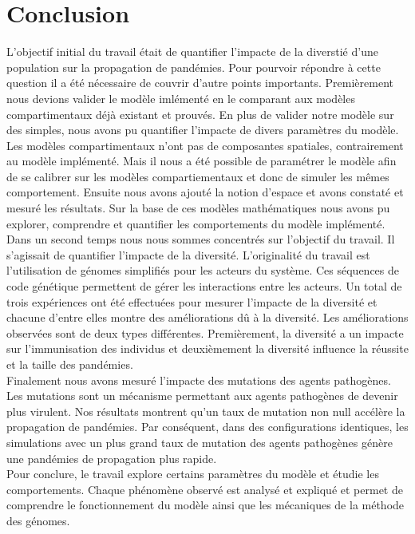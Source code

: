\chapter{Conclusion} \label{ch:conclusion}

L'objectif initial du travail était de quantifier l'impacte de la diverstié d'une population sur la propagation de pandémies. Pour pourvoir répondre à cette question il a été nécessaire de couvrir d'autre points importants. Premièrement nous devions valider le modèle imlémenté en le comparant aux modèles compartimentaux déjà existant et prouvés. En plus de valider notre modèle sur des simples, nous avons pu quantifier l'impacte de divers paramètres du modèle. Les modèles compartimentaux n'ont pas de composantes spatiales, contrairement au modèle implémenté. Mais il nous a été possible de paramétrer le modèle afin de se calibrer sur les modèles compartiementaux et donc de simuler les mêmes comportement. Ensuite nous avons ajouté la notion d'espace et avons constaté et mesuré les résultats. Sur la base de ces modèles mathématiques nous avons pu explorer, comprendre et quantifier les comportements du modèle implémenté.\\

Dans un second temps nous nous sommes concentrés sur l'objectif du travail. Il s'agissait de quantifier l'impacte de la diversité. L'originalité du travail est l'utilisation de génomes simplifiés pour les acteurs du système. Ces séquences de code génétique permettent de gérer les interactions entre les acteurs. Un total de trois expériences ont été effectuées pour mesurer l'impacte de la diversité et chacune d'entre elles montre des améliorations dû à la diversité. Les améliorations observées sont de deux types différentes. Premièrement, la diversité a un impacte sur l'immunisation des individus et deuxièmement la diversité influence la réussite et la taille des pandémies.\\

Finalement nous avons mesuré l'impacte des mutations des agents pathogènes. Les mutations sont un mécanisme permettant aux agents pathogènes de devenir plus virulent. Nos résultats montrent qu'un taux de mutation non null accélère la propagation de pandémies. Par conséquent, dans des configurations identiques, les simulations avec un plus grand taux de mutation des agents pathogènes génère une pandémies de propagation plus rapide.\\

Pour conclure, le travail explore certains paramètres du modèle et étudie les comportements. Chaque phénomène observé est analysé et expliqué et permet de comprendre le fonctionnement du modèle ainsi que les mécaniques de la méthode des génomes. 